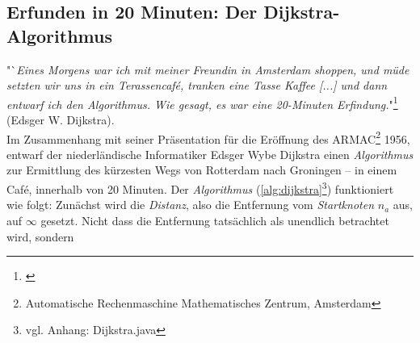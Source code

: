 \documentclass[12pt]{article}
\begin{document}
\subsection{Erfunden in 20 Minuten: Der Dijkstra-Algorithmus}
\label{sec:dijk}
"`{\em Eines Morgens war ich mit meiner Freundin in Amsterdam shoppen, und müde setzten wir uns in ein Terassencafé, tranken eine Tasse Kaffee [...] und dann entwarf ich den Algorithmus. Wie gesagt, es war eine 20-Minuten Erfindung.}"\footnote{\cite[(engl.), S. 42f]{interview}} (Edsger W. Dijkstra).
\\
Im Zusammenhang mit seiner Präsentation für die Eröffnung des ARMAC\footnote{Automatische Rechenmaschine Mathematisches Zentrum, Amsterdam} 1956, entwarf der niederländische Informatiker Edsger Wybe Dijkstra einen \textit{Algorithmus} zur Ermittlung des kürzesten Wegs von Rotterdam nach Groningen -- in einem Café, innerhalb von 20 Minuten. Der \textit{Algorithmus} (\autoref{alg:dijkstra}\footnote{vgl. Anhang: Dijkstra.java}) funktioniert wie folgt:
\newpage
\noindent Zunächst wird die \textit{Distanz}, also die Entfernung vom \textit{Startknoten} $n_a$ aus, auf $\infty$ gesetzt. Nicht dass die Entfernung tatsächlich als unendlich betrachtet wird, sondern 
\end{document}
